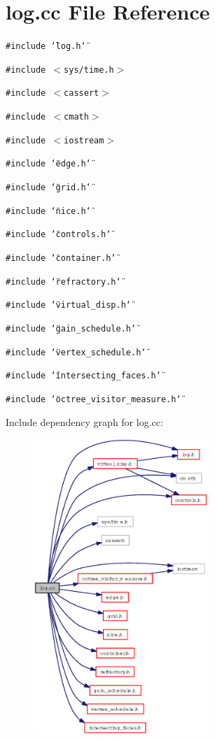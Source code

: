\section{log.cc File Reference}
\label{log_8cc}
{\tt \#include \char`\"{}log.h\char`\"{}}\par
{\tt \#include $<$sys/time.h$>$}\par
{\tt \#include $<$cassert$>$}\par
{\tt \#include $<$cmath$>$}\par
{\tt \#include $<$iostream$>$}\par
{\tt \#include \char`\"{}edge.h\char`\"{}}\par
{\tt \#include \char`\"{}grid.h\char`\"{}}\par
{\tt \#include \char`\"{}nice.h\char`\"{}}\par
{\tt \#include \char`\"{}controls.h\char`\"{}}\par
{\tt \#include \char`\"{}container.h\char`\"{}}\par
{\tt \#include \char`\"{}refractory.h\char`\"{}}\par
{\tt \#include \char`\"{}virtual\_\-disp.h\char`\"{}}\par
{\tt \#include \char`\"{}gain\_\-schedule.h\char`\"{}}\par
{\tt \#include \char`\"{}vertex\_\-schedule.h\char`\"{}}\par
{\tt \#include \char`\"{}intersecting\_\-faces.h\char`\"{}}\par
{\tt \#include \char`\"{}octree\_\-visitor\_\-measure.h\char`\"{}}\par


Include dependency graph for log.cc:\begin{figure}[H]
\begin{center}
\leavevmode
\includegraphics[width=187pt]{log_8cc__incl}
\end{center}
\end{figure}
